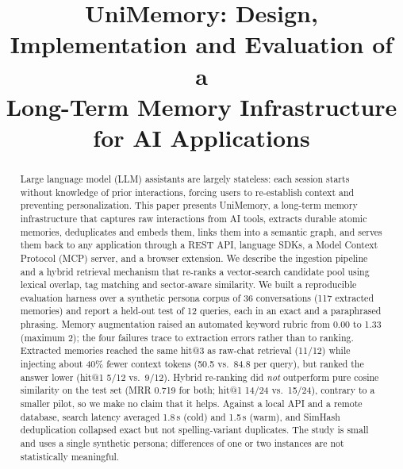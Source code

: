 \documentclass[conference]{IEEEtran}
\begin{document}
\title{UniMemory: Design, Implementation and Evaluation of a\\
Long-Term Memory Infrastructure for AI Applications}

\author{
}

\maketitle

\begin{abstract}
Large language model (LLM) assistants are largely stateless: each session
starts without knowledge of prior interactions, forcing users to re-establish
context and preventing personalization. This paper presents UniMemory, a
long-term memory infrastructure that captures raw interactions from AI tools,
extracts durable atomic memories, deduplicates and embeds them, links them into
a semantic graph, and serves them back to any application through a REST API,
language SDKs, a Model Context Protocol (MCP) server, and a browser extension.
We describe the ingestion pipeline and a hybrid retrieval mechanism that
re-ranks a vector-search candidate pool using lexical overlap, tag matching and
sector-aware similarity. We built a reproducible evaluation harness over a
synthetic persona corpus of 36 conversations (117 extracted memories) and report
a held-out test of 12 queries, each in an exact and a paraphrased phrasing.
Memory augmentation raised an automated keyword rubric from 0.00 to 1.33
(maximum 2); the four failures trace to extraction errors rather than to ranking.
Extracted memories reached the same hit@3 as raw-chat retrieval (11/12) while
injecting about 40\% fewer context tokens (50.5 vs.\ 84.8 per query), but ranked
the answer lower (hit@1 5/12 vs.\ 9/12). Hybrid re-ranking did \emph{not}
outperform pure cosine similarity on the test set (MRR 0.719 for both; hit@1
14/24 vs.\ 15/24), contrary to a smaller pilot, so we make no claim that it
helps. Against a local API and a remote database, search latency averaged
1.8\,s (cold) and 1.5\,s (warm), and SimHash deduplication collapsed exact but
not spelling-variant duplicates. The study is small and uses a single synthetic
persona; differences of one or two instances are not statistically meaningful.
\end{abstract}
\end{document}

